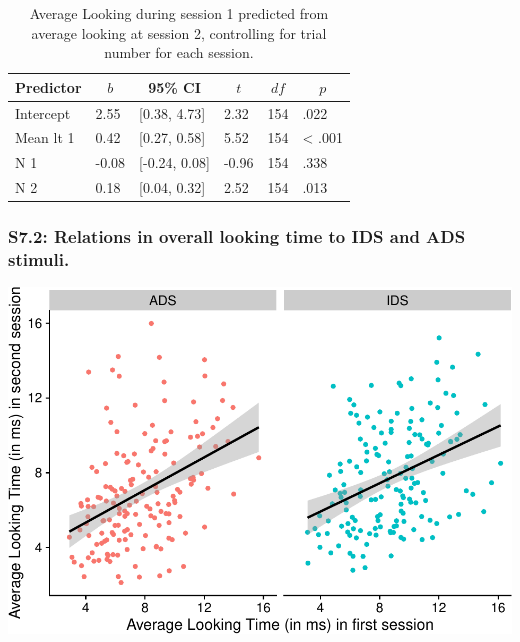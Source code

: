 \documentclass[
  man, donotrepeattitle,floatsintext]{apa6}
\begin{document}
\begin{table}[tbp]

\begin{center}
\begin{threeparttable}

\caption{\label{tab:unnamed-chunk-8}Average Looking during session 1 predicted from average looking at session 2, controlling for trial number for each session.}

\begin{tabular}{llllll}
\toprule
Predictor & \multicolumn{1}{c}{$b$} & \multicolumn{1}{c}{95\% CI} & \multicolumn{1}{c}{$t$} & \multicolumn{1}{c}{$\mathit{df}$} & \multicolumn{1}{c}{$p$}\\
\midrule
Intercept & 2.55 & {}[0.38, 4.73] & 2.32 & 154 & .022\\
Mean lt 1 & 0.42 & {}[0.27, 0.58] & 5.52 & 154 & < .001\\
N 1 & -0.08 & {}[-0.24, 0.08] & -0.96 & 154 & .338\\
N 2 & 0.18 & {}[0.04, 0.32] & 2.52 & 154 & .013\\
\bottomrule
\end{tabular}

\end{threeparttable}
\end{center}

\end{table}

\hypertarget{s7.2-relations-in-overall-looking-time-to-ids-and-ads-stimuli.}{%
\subsubsection{S7.2: Relations in overall looking time to IDS and ADS stimuli.}\label{s7.2-relations-in-overall-looking-time-to-ids-and-ads-stimuli.}}

\includegraphics{MB1T_supplement_files/figure-latex/unnamed-chunk-9-1.pdf}
\end{document}
